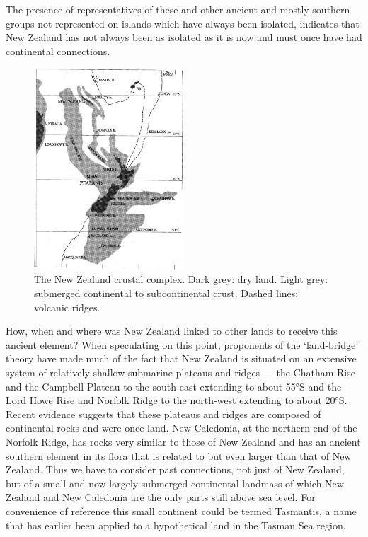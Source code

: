 The presence of representatives of these and other ancient and mostly southern groups not represented on islands which have always been isolated, indicates that New Zealand has not always been as isolated as it is now and must once have had continental connections.

\begin{figure}
	\includegraphics[width=0.5\textwidth]{graphics/figure2crust.jpg}
	\centering
	\caption[The New Zealand crustal complex]{The New Zealand crustal complex.
Dark grey: dry land.
Light grey: submerged continental to subcontinental crust.
Dashed lines: volcanic ridges.}%
	\label{fig:2crust}
\end{figure}

How, when and where was New Zealand linked to other lands to receive this ancient element? When speculating on this point, proponents of the `land-bridge' theory have made much of the fact that New Zealand is situated on an extensive system of relatively shallow submarine plateaus and ridges --- the Chatham Rise and the Campbell Plateau to the south-east extending to about 55°S and the Lord Howe Rise and Norfolk Ridge to the north-west extending to about 20°S.
Recent evidence suggests that these plateaus and ridges are composed of continental rocks and were once land.
New Caledonia, at the northern end of the Norfolk Ridge, has rocks very similar to those of New Zealand and has an ancient southern element in its flora that is related to but even larger than that of New Zealand.
Thus we have to consider past connections, not just of New Zealand, but of a small and now largely submerged continental landmass of which New Zealand and New Caledonia are the only parts still above sea level.
For convenience of reference this small continent could be termed Tasmantis, a name that has earlier been applied to a hypothetical land in the Tasman Sea region.

